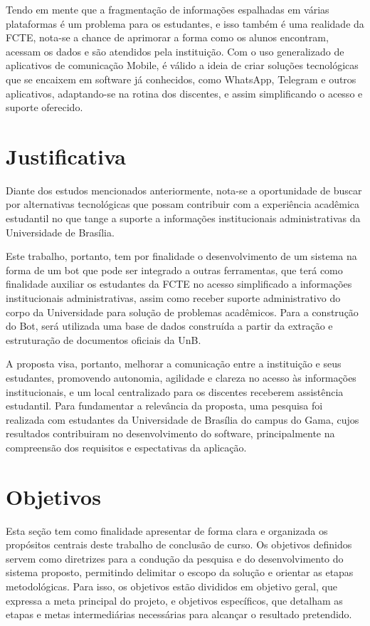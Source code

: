 Tendo em mente que a fragmentação de informações espalhadas em várias plataformas é um problema para os estudantes, e isso também é uma realidade da FCTE, nota-se a chance de aprimorar a forma como os alunos encontram, acessam os dados e são atendidos pela instituição. Com o uso generalizado de aplicativos de comunicação Mobile, é válido a ideia de criar soluções tecnológicas que se encaixem em software já conhecidos, como WhatsApp, Telegram e outros aplicativos, adaptando-se na rotina dos discentes, e assim simplificando o acesso e suporte oferecido.

\section{Justificativa}

Diante dos estudos mencionados anteriormente, nota-se a oportunidade de buscar por alternativas tecnológicas que possam contribuir com a experiência acadêmica estudantil no que tange a suporte a informações institucionais administrativas da Universidade de Brasília.

Este trabalho, portanto, tem por finalidade o desenvolvimento de um sistema na forma de um bot que pode ser integrado a outras ferramentas, que terá como finalidade auxiliar os estudantes da FCTE no acesso simplificado a informações institucionais administrativas, assim como receber suporte administrativo do corpo da Universidade para solução de problemas acadêmicos. Para a construção do Bot, será utilizada uma base de dados construída a partir da extração e estruturação de documentos oficiais da UnB.

A proposta visa, portanto, melhorar a comunicação entre a instituição e seus estudantes, promovendo autonomia, agilidade e clareza no acesso às informações institucionais, e um local centralizado para os discentes receberem assistência estudantil. Para fundamentar a relevância da proposta, uma pesquisa foi realizada com estudantes da Universidade de Brasília do campus do Gama, cujos resultados contribuiram no desenvolvimento do software, principalmente na compreensão dos requisitos e espectativas da aplicação.

\section{Objetivos}

Esta seção tem como finalidade apresentar de forma clara e organizada os propósitos centrais deste trabalho de conclusão de curso. Os objetivos definidos servem como diretrizes para a condução da pesquisa e do desenvolvimento do sistema proposto, permitindo delimitar o escopo da solução e orientar as etapas metodológicas. Para isso, os objetivos estão divididos em objetivo geral, que expressa a meta principal do projeto, e objetivos específicos, que detalham as etapas e metas intermediárias necessárias para alcançar o resultado pretendido.

